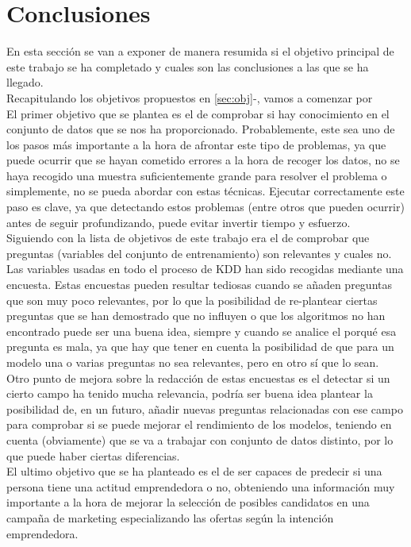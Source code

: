 \chapter{Conclusiones}
\label{sec:conclusiones}
En esta sección se van a exponer de manera resumida si el objetivo principal de este trabajo se ha completado y cuales son las conclusiones a las que se ha llegado.\\
\linebreak
Recapitulando los objetivos propuestos en \ref{sec:obj}-, vamos a comenzar por \\
\linebreak
El primer objetivo que se plantea es el de comprobar si hay conocimiento en el conjunto de datos que se nos ha proporcionado. Probablemente, este sea uno de los pasos más importante a la hora de afrontar este tipo de problemas, ya que puede ocurrir que se hayan cometido errores a la hora de recoger los datos, no se haya recogido una muestra suficientemente grande para resolver el problema o simplemente, no se pueda abordar con estas técnicas. Ejecutar correctamente este paso es clave, ya que detectando estos problemas (entre otros que pueden ocurrir) antes de seguir profundizando, puede evitar invertir tiempo y esfuerzo.\\
\linebreak
Siguiendo con la lista de objetivos de este trabajo era el de comprobar que preguntas (variables del conjunto de entrenamiento) son relevantes y cuales no. Las variables usadas en todo el proceso de KDD han sido recogidas mediante una encuesta. Estas encuestas pueden resultar tediosas cuando se añaden preguntas que son muy poco relevantes, por lo que la posibilidad de re-plantear ciertas preguntas que se han demostrado que no influyen o que los algoritmos no han encontrado puede ser una buena idea, siempre y cuando se analice el porqué esa pregunta es mala, ya que hay que tener en cuenta la posibilidad de que para un modelo una o varias preguntas no sea relevantes, pero en otro  sí que lo sean.\\
\linebreak
Otro punto de mejora sobre la redacción de estas encuestas es el detectar si un cierto campo ha tenido mucha relevancia, podría ser buena idea plantear la posibilidad de, en un futuro, añadir nuevas preguntas relacionadas con ese campo para comprobar si se puede mejorar el rendimiento de los modelos, teniendo en cuenta (obviamente) que se va a trabajar con conjunto de datos distinto, por lo que puede haber ciertas diferencias.\\
\linebreak
El ultimo objetivo que se ha planteado es el de ser capaces de predecir si una persona tiene una actitud emprendedora o no, obteniendo una información muy importante a la hora de mejorar la selección de posibles candidatos en una campaña de marketing especializando las ofertas según la intención emprendedora. 

